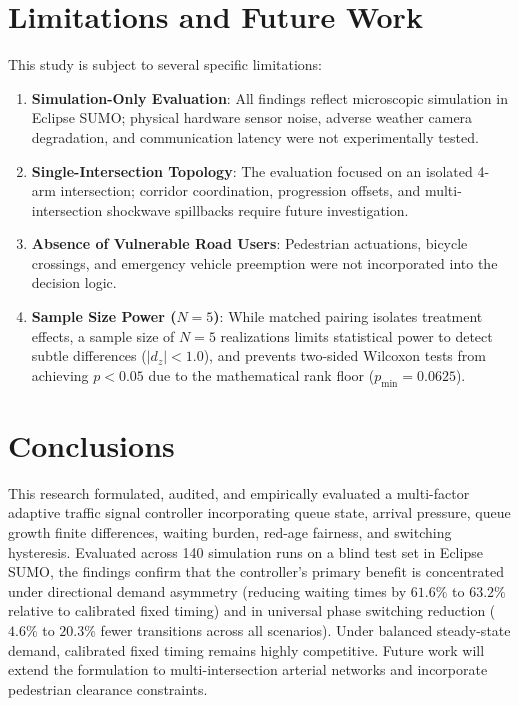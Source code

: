 \documentclass[11pt,journal,onecolumn]{article}
\begin{document}
\section{Limitations and Future Work}
This study is subject to several specific limitations:
\begin{enumerate}
    \item \textbf{Simulation-Only Evaluation}: All findings reflect microscopic simulation in Eclipse SUMO; physical hardware sensor noise, adverse weather camera degradation, and communication latency were not experimentally tested.
    \item \textbf{Single-Intersection Topology}: The evaluation focused on an isolated 4-arm intersection; corridor coordination, progression offsets, and multi-intersection shockwave spillbacks require future investigation.
    \item \textbf{Absence of Vulnerable Road Users}: Pedestrian actuations, bicycle crossings, and emergency vehicle preemption were not incorporated into the decision logic.
    \item \textbf{Sample Size Power ($N=5$)}: While matched pairing isolates treatment effects, a sample size of $N=5$ realizations limits statistical power to detect subtle differences ($|d_z| < 1.0$), and prevents two-sided Wilcoxon tests from achieving $p < 0.05$ due to the mathematical rank floor ($p_{\text{min}} = 0.0625$).
\end{enumerate}

\section{Conclusions}
This research formulated, audited, and empirically evaluated a multi-factor adaptive traffic signal controller incorporating queue state, arrival pressure, queue growth finite differences, waiting burden, red-age fairness, and switching hysteresis. Evaluated across 140 simulation runs on a blind test set in Eclipse SUMO, the findings confirm that the controller's primary benefit is concentrated under directional demand asymmetry (reducing waiting times by $61.6\%$ to $63.2\%$ relative to calibrated fixed timing) and in universal phase switching reduction ($4.6\%$ to $20.3\%$ fewer transitions across all scenarios). Under balanced steady-state demand, calibrated fixed timing remains highly competitive. Future work will extend the formulation to multi-intersection arterial networks and incorporate pedestrian clearance constraints.
\end{document}
